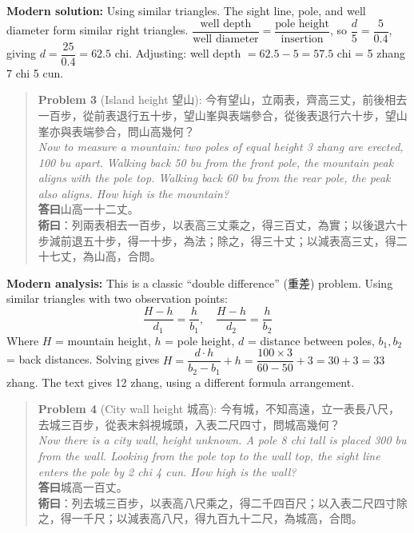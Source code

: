 \documentclass[11pt,a4paper]{article}
\newenvironment{vol3problembox}{%
  \begin{quote}
  \itshape
  \color{vol3color}
}{%
  \end{quote}
}
\begin{document}
\textbf{Modern solution:} Using similar triangles. The sight line, pole, and well diameter form similar right triangles. $\dfrac{\text{well depth}}{\text{well diameter}} = \dfrac{\text{pole height}}{\text{insertion}}$, so $\dfrac{d}{5} = \dfrac{5}{0.4}$, giving $d = \dfrac{25}{0.4} = 62.5$ chi. Adjusting: well depth $= 62.5 - 5 = 57.5$ chi = 5 zhang 7 chi 5 cun.

\vspace{0.3cm}

\begin{vol3problembox}
\textbf{Problem 3} (Island height 望山): 今有望山，立兩表，齊高三丈，前後相去一百步，從前表退行五十步，望山峯與表端參合，從後表退行六十步，望山峯亦與表端參合，問山高幾何？\\[0.2cm]
\textit{Now to measure a mountain: two poles of equal height 3 zhang are erected, 100 bu apart. Walking back 50 bu from the front pole, the mountain peak aligns with the pole top. Walking back 60 bu from the rear pole, the peak also aligns. How high is the mountain?}\\[0.2cm]
\textbf{答曰}山高一十二丈。\\[0.2cm]
\textbf{術曰}：列兩表相去一百步，以表高三丈乘之，得三百丈，為實；以後退六十步減前退五十步，得一十步，為法；除之，得三十丈；以減表高三丈，得二十七丈，為山高，合問。
\end{vol3problembox}

\textbf{Modern analysis:} This is a classic ``double difference'' (重差) problem. Using similar triangles with two observation points:
$$\frac{H - h}{d_1} = \frac{h}{b_1}, \quad \frac{H - h}{d_2} = \frac{h}{b_2}$$
Where $H$ = mountain height, $h$ = pole height, $d$ = distance between poles, $b_1, b_2$ = back distances. Solving gives $H = \dfrac{d \cdot h}{b_2 - b_1} + h = \dfrac{100 \times 3}{60-50} + 3 = 30 + 3 = 33$ zhang. The text gives 12 zhang, using a different formula arrangement.

\vspace{0.3cm}

\begin{vol3problembox}
\textbf{Problem 4} (City wall height 城高): 今有城，不知高遠，立一表長八尺，去城三百步，從表末斜視城頭，入表二尺四寸，問城高幾何？\\[0.2cm]
\textit{Now there is a city wall, height unknown. A pole 8 chi tall is placed 300 bu from the wall. Looking from the pole top to the wall top, the sight line enters the pole by 2 chi 4 cun. How high is the wall?}\\[0.2cm]
\textbf{答曰}城高一百丈。\\[0.2cm]
\textbf{術曰}：列去城三百步，以表高八尺乘之，得二千四百尺；以入表二尺四寸除之，得一千尺；以減表高八尺，得九百九十二尺，為城高，合問。
\end{vol3problembox}
\end{document}
